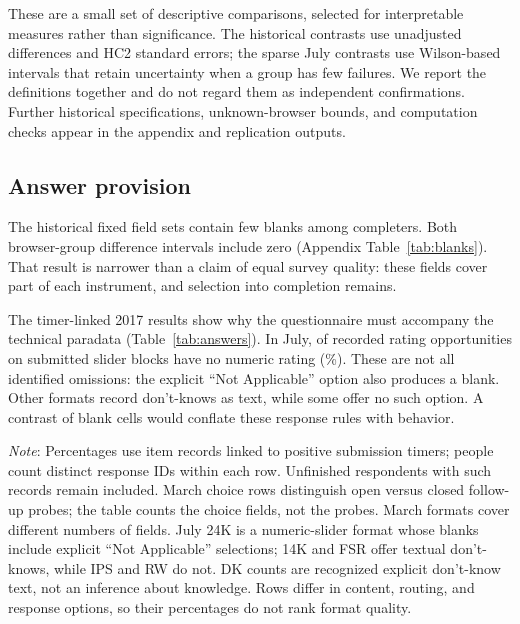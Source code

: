 \documentclass[11pt]{article}
\begin{document}
These are a small set of descriptive comparisons, selected for interpretable measures rather than significance. The historical contrasts use unadjusted differences and HC2 standard errors; the sparse July contrasts use Wilson-based intervals that retain uncertainty when a group has few failures. We report the definitions together and do not regard them as independent confirmations. Further historical specifications, unknown-browser bounds, and computation checks appear in the appendix and replication outputs.

\subsection{Answer provision}

The historical fixed field sets contain few blanks among completers. Both browser-group difference intervals include zero (Appendix Table~\ref{tab:blanks}). That result is narrower than a claim of equal survey quality: these fields cover part of each instrument, and selection into completion remains.

The timer-linked 2017 results show why the questionnaire must accompany the technical paradata (Table~\ref{tab:answers}). In July, \SliderBlanks{} of \SliderItems{} recorded rating opportunities on submitted slider blocks have no numeric rating (\SliderRate\%). These are not all identified omissions: the explicit ``Not Applicable'' option also produces a blank. Other formats record don't-knows as text, while some offer no such option. A contrast of blank cells would conflate these response rules with behavior.

\begin{table}[htbp]
\centering
\caption{Recorded answers on timer-linked submitted blocks.}
\label{tab:answers}
\small

\par\smallskip
\begin{minipage}{\linewidth}\footnotesize
\emph{Note}: Percentages use item records linked to positive submission timers; people count distinct response IDs within each row. Unfinished respondents with such records remain included. March choice rows distinguish open versus closed follow-up probes; the table counts the choice fields, not the probes. March formats cover different numbers of fields. July 24K is a numeric-slider format whose blanks include explicit ``Not Applicable'' selections; 14K and FSR offer textual don't-knows, while IPS and RW do not. DK counts are recognized explicit don't-know text, not an inference about knowledge. Rows differ in content, routing, and response options, so their percentages do not rank format quality.
\end{minipage}
\end{table}
\end{document}
